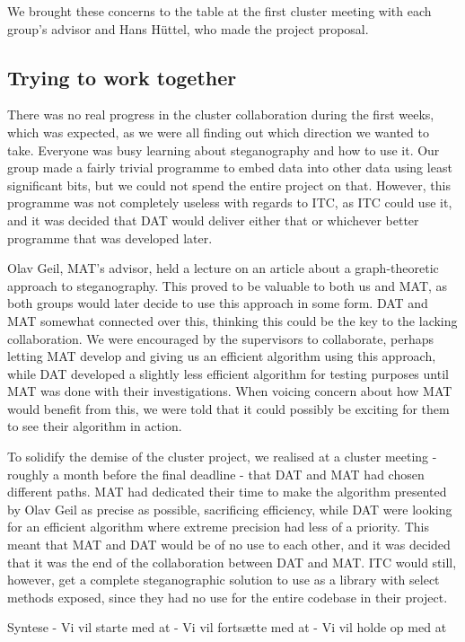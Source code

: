 \documentclass{article}
\begin{document}
We brought these concerns to the table at the first cluster meeting with each group's advisor and Hans H{\"u}ttel, who made the project proposal.

\subsection*{Trying to work together}
There was no real progress in the cluster collaboration during the first weeks, which was expected, as we were all finding out which direction we wanted to take.
Everyone was busy learning about steganography and how to use it.
Our group made a fairly trivial programme to embed data into other data using least significant bits, but we could not spend the entire project on that. However, this programme was not completely useless with regards to ITC, as ITC could use it, and it was decided that DAT would deliver either that or whichever better programme that was developed later.

Olav Geil, MAT's advisor, held a lecture on an article about a graph-theoretic approach to steganography.
This proved to be valuable to both us and MAT, as both groups would later decide to use this approach in some form.
DAT and MAT somewhat connected over this, thinking this could be the key to the lacking collaboration.
We were encouraged by the supervisors to collaborate, perhaps letting MAT develop and giving us an efficient algorithm using this approach, while DAT developed a slightly less efficient algorithm for testing purposes until MAT was done with their investigations.
When voicing concern about how MAT would benefit from this, we were told that it could possibly be exciting for them to see their algorithm in action.

To solidify the demise of the cluster project, we realised at a cluster meeting - roughly a month before the final deadline - that DAT and MAT had chosen different paths.
MAT had dedicated their time to make the algorithm presented by Olav Geil as precise as possible, sacrificing efficiency, while DAT were looking for an efficient algorithm where extreme precision had less of a priority.
This meant that MAT and DAT would be of no use to each other, and it was decided that it was the end of the collaboration between DAT and MAT.
ITC would still, however, get a complete steganographic solution to use as a library with select methods exposed, since they had no use for the entire codebase in their project.

Syntese
 - Vi vil starte med at
 - Vi vil fortsætte med at
 - Vi vil holde op med at
\end{document}
